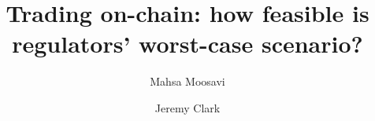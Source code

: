 \documentclass[letterpaper,twocolumn,10pt]{article}
\begin{document}

\title{\Large \bf Trading on-chain: how feasible is regulators' worst-case scenario?}

\author{Mahsa Moosavi}
\author{Jeremy Clark}



\maketitle










\appendix





\end{document}
